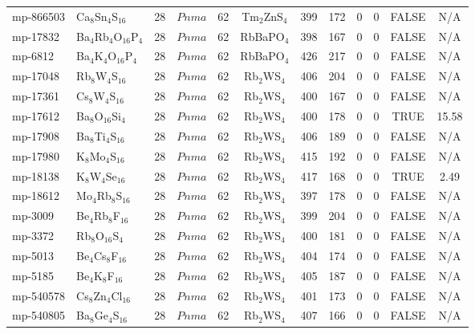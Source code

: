 {\begin{longtable}{llcccccccccc}
    mp-866503 & Ca$_{8}$Sn$_{4}$S$_{16}$ & 28    & $Pnma$ & 62    & Tm$_{2}$ZnS$_{4}$ & 399   & 172   & 0     & 0     & FALSE & N/A \\
    mp-17832 & Ba$_{4}$Rb$_{4}$O$_{16}$P$_{4}$ & 28    & $Pnma$ & 62    & RbBaPO$_{4}$ & 398   & 167   & 0     & 0     & FALSE & N/A \\
    mp-6812 & Ba$_{4}$K$_{4}$O$_{16}$P$_{4}$ & 28    & $Pnma$ & 62    & RbBaPO$_{4}$ & 426   & 217   & 0     & 0     & FALSE & N/A \\
    mp-17048 & Rb$_{8}$W$_{4}$S$_{16}$ & 28    & $Pnma$ & 62    & Rb$_{2}$WS$_{4}$ & 406   & 204   & 0     & 0     & FALSE & N/A \\
    mp-17361 & Cs$_{8}$W$_{4}$S$_{16}$ & 28    & $Pnma$ & 62    & Rb$_{2}$WS$_{4}$ & 400   & 167   & 0     & 0     & FALSE & N/A \\
    mp-17612 & Ba$_{8}$O$_{16}$Si$_{4}$ & 28    & $Pnma$ & 62    & Rb$_{2}$WS$_{4}$ & 400   & 178   & 0     & 0     & TRUE  & 15.58  \\
    mp-17908 & Ba$_{8}$Ti$_{4}$S$_{16}$ & 28    & $Pnma$ & 62    & Rb$_{2}$WS$_{4}$ & 406   & 189   & 0     & 0     & FALSE & N/A \\
    mp-17980 & K$_{8}$Mo$_{4}$S$_{16}$ & 28    & $Pnma$ & 62    & Rb$_{2}$WS$_{4}$ & 415   & 192   & 0     & 0     & FALSE & N/A \\
    mp-18138 & K$_{8}$W$_{4}$Se$_{16}$ & 28    & $Pnma$ & 62    & Rb$_{2}$WS$_{4}$ & 417   & 168   & 0     & 0     & TRUE  & 2.49  \\
    mp-18612 & Mo$_{4}$Rb$_{8}$S$_{16}$ & 28    & $Pnma$ & 62    & Rb$_{2}$WS$_{4}$ & 397   & 178   & 0     & 0     & FALSE & N/A \\
    mp-3009 & Be$_{4}$Rb$_{8}$F$_{16}$ & 28    & $Pnma$ & 62    & Rb$_{2}$WS$_{4}$ & 399   & 204   & 0     & 0     & FALSE & N/A \\
    mp-3372 & Rb$_{8}$O$_{16}$S$_{4}$ & 28    & $Pnma$ & 62    & Rb$_{2}$WS$_{4}$ & 400   & 181   & 0     & 0     & FALSE & N/A \\
    mp-5013 & Be$_{4}$Cs$_{8}$F$_{16}$ & 28    & $Pnma$ & 62    & Rb$_{2}$WS$_{4}$ & 404   & 174   & 0     & 0     & FALSE & N/A \\
    mp-5185 & Be$_{4}$K$_{8}$F$_{16}$ & 28    & $Pnma$ & 62    & Rb$_{2}$WS$_{4}$ & 405   & 187   & 0     & 0     & FALSE & N/A \\
    mp-540578 & Cs$_{8}$Zn$_{4}$Cl$_{16}$ & 28    & $Pnma$ & 62    & Rb$_{2}$WS$_{4}$ & 401   & 173   & 0     & 0     & FALSE & N/A \\
    mp-540805 & Ba$_{8}$Ge$_{4}$S$_{16}$ & 28    & $Pnma$ & 62    & Rb$_{2}$WS$_{4}$ & 407   & 166   & 0     & 0     & FALSE & N/A \\

\end{longtable}}
